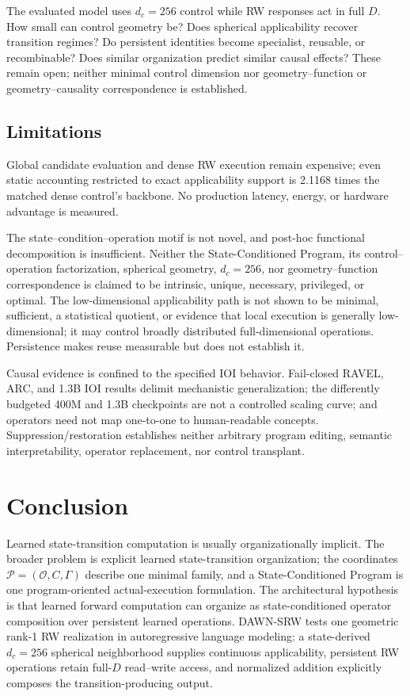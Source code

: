\documentclass{article}
\newcommand{\DAWN}{DAWN-SRW}
\begin{document}
The evaluated model uses \(d_c=256\) control while RW responses act in full
\(D\). How small can control geometry be? Does spherical applicability recover
transition regimes? Do persistent identities become specialist, reusable, or
recombinable? Does similar organization predict similar causal effects? These
remain open; neither minimal control dimension nor geometry--function or
geometry--causality correspondence is established.

\subsection{Limitations}

Global candidate evaluation and dense RW execution remain expensive; even static
accounting restricted to exact applicability support is 2.1168 times the matched
dense control's backbone. No production latency, energy, or hardware advantage
is measured.

The state--condition--operation motif is not novel, and post-hoc functional
decomposition is insufficient. Neither the State-Conditioned Program, its
control--operation factorization, spherical geometry, \(d_c=256\), nor
geometry--function correspondence is claimed to be intrinsic, unique, necessary,
privileged, or optimal. The low-dimensional applicability path is not shown to be
minimal, sufficient, a statistical quotient, or evidence that local execution is
generally low-dimensional; it may control broadly distributed full-dimensional
operations. Persistence makes reuse measurable but does not establish it.

Causal evidence is confined to the specified IOI behavior. Fail-closed RAVEL,
ARC, and 1.3B IOI results delimit mechanistic generalization; the differently
budgeted 400M and 1.3B checkpoints are not a controlled scaling curve; and
operators need not map one-to-one to human-readable concepts.
Suppression/restoration establishes neither arbitrary program editing, semantic
interpretability, operator replacement, nor control transplant.

\balance
\section{Conclusion}

Learned state-transition computation is usually organizationally implicit. The
broader problem is explicit learned state-transition organization; the coordinates
\(\mathcal P=(\mathcal O,C,\Gamma)\) describe one minimal family, and a
State-Conditioned Program is one program-oriented actual-execution formulation.
The architectural hypothesis is that learned forward computation can organize as
state-conditioned operator composition over persistent learned operations.
\DAWN{} tests one geometric rank-1 RW realization in autoregressive language
modeling: a state-derived \(d_c=256\) spherical neighborhood supplies continuous
applicability, persistent RW operations retain full-\(D\) read--write access, and
normalized addition explicitly composes the transition-producing output.
\end{document}

